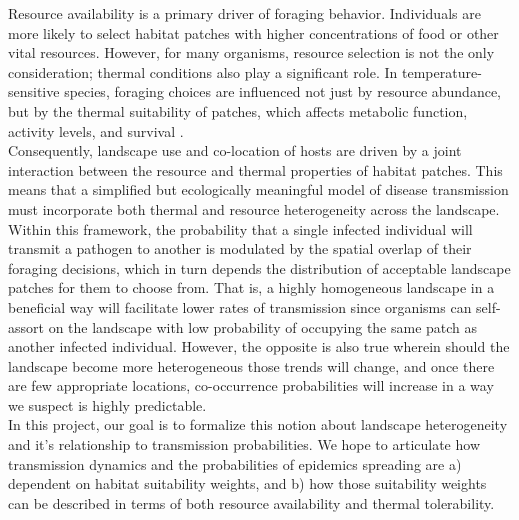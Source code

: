 Resource availability is a primary driver of foraging behavior. Individuals are more likely to select habitat patches with higher concentrations of food or other vital resources. However, for many organisms, resource selection is not the only consideration; thermal conditions also play a significant role. In temperature-sensitive species, foraging choices are influenced not just by resource abundance, but by the thermal suitability of patches, which affects metabolic function, activity levels, and survival \citep{tomecekInadequateThermalRefuge2017,nowakowskiChangingThermalLandscapes2018}. \\

Consequently, landscape use and co-location of hosts are driven by a joint interaction between the resource and thermal properties of habitat patches. This means that a simplified but ecologically meaningful model of disease transmission must incorporate both thermal and resource heterogeneity across the landscape. Within this framework, the probability that a single infected individual will transmit a pathogen to another is modulated by the spatial overlap of their foraging decisions, which in turn depends the distribution of acceptable landscape patches for them to choose from. That is, a highly homogeneous landscape in a beneficial way will facilitate lower rates of transmission since organisms can self-assort on the landscape with low probability of occupying the same patch as another infected individual. However, the opposite is also true wherein should the landscape become more heterogeneous those trends will change, and once there are few appropriate locations, co-occurrence probabilities will increase in a way we suspect is highly predictable. \\

In this project, our goal is to formalize this notion about landscape heterogeneity and it's relationship to transmission probabilities. We hope to articulate how transmission dynamics and the probabilities of epidemics spreading are a) dependent on habitat suitability weights, and b) how those suitability weights can be described in terms of both resource availability and thermal tolerability. 



